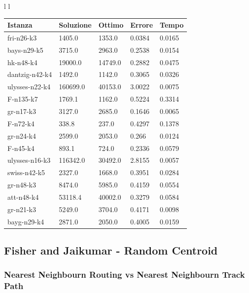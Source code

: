 \documentclass[]{article}
\begin{document}
\begin{tabular}{l l}
\small		
	\begin{tabular}{||l | l l l l||} 
		\hline
		Istanza & Soluzione & Ottimo & Errore & Tempo \\ [0.5ex] 
		\hline\hline
		fri-n26-k3 & 1405.0 & 1353.0 & 0.0384 & 0.0165  \\
		bays-n29-k5 & 3715.0 & 2963.0 & 0.2538 & 0.0154  \\
		hk-n48-k4 & 19000.0 & 14749.0 & 0.2882 & 0.0475  \\
		dantzig-n42-k4 & 1492.0 & 1142.0 & 0.3065 & 0.0326  \\
		ulysses-n22-k4 & 160699.0 & 40153.0 & 3.0022 & 0.0075  \\
		F-n135-k7 & 1769.1 & 1162.0 & 0.5224 & 0.3314  \\
		gr-n17-k3 & 3127.0 & 2685.0 & 0.1646 & 0.0065  \\
		F-n72-k4 & 338.8 & 237.0 & 0.4297 & 0.1378  \\
		gr-n24-k4 & 2599.0 & 2053.0 & 0.266 & 0.0124  \\
		F-n45-k4 & 893.1 & 724.0 & 0.2336 & 0.0579  \\
		ulysses-n16-k3 & 116342.0 & 30492.0 & 2.8155 & 0.0057  \\
		swiss-n42-k5 & 2327.0 & 1668.0 & 0.3951 & 0.0284  \\
		gr-n48-k3 & 8474.0 & 5985.0 & 0.4159 & 0.0554  \\
		att-n48-k4 & 53118.4 & 40002.0 & 0.3279 & 0.0584  \\
		gr-n21-k3 & 5249.0 & 3704.0 & 0.4171 & 0.0098  \\
		bayg-n29-k4 & 2871.0 & 2050.0 & 0.4005 & 0.0159  \\		
		[1ex] 
		\hline
	\end{tabular}
	
\end{tabular}



\subsection{Fisher and Jaikumar - Random Centroid}

\subsubsection{Nearest Neighbourn Routing vs Nearest Neighbourn Track Path }
\end{document}
